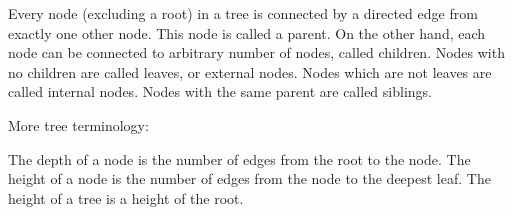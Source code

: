 \documentclass[12pt]{article}
\begin{document}
Every node (excluding a root) in a tree is connected by a directed edge from exactly one other node. This node is called a parent. On the other hand, each node can be connected to arbitrary number of nodes, called children. Nodes with no children are called leaves, or external nodes. Nodes which are not leaves are called internal nodes. Nodes with the same parent are called siblings.

   
More tree terminology:

The depth of a node is the number of edges from the root to the node.
The height of a node is the number of edges from the node to the deepest leaf.
The height of a tree is a height of the root.



\end{document}
